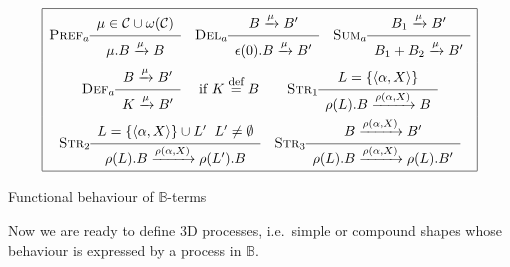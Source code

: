 \documentclass[11pt]{article}
\newcommand{\channels}{{\cal C}}
\newcommand{\bpa}{\mathbb{B}}
\def\sos#1#2{{\def\arraystretch{1.6}\begin{array}{c}#1\\\hline
#2\end{array}}}
\newcommand{\nar}[1]{\xrightarrow{#1}}
\def\name#1{\mbox{\sc #1}}
\newcommand{\equaldef}{\stackrel{\mbox{\footnotesize{def}}}{=}}
\begin{document}
{\small
\begin{table}[t]
\[
\begin{array}{|c|}
\hline
\name{Pref$_{a}$} \sos{\mu \in \channels \cup \omega(\channels)}{\mu.B \nar{\mu} B
} \quad
\name{Del$_a$} \sos{ B \nar{\mu} B'}{\epsilon(0).B \nar{\mu} B'
} \quad
\name{Sum$_a$} \sos{B_1 \nar{\mu} B'}{B_1 + B_2 \nar{\mu} B'}  \\
\name{Def$_a$} \sos{B \nar{\mu} B'} {K \nar{\mu} B'} \quad  \mbox{ if } K \equaldef B\qquad
\name{Str$_{1}$} \sos{L=\{\langle \alpha, X \rangle\}}{\rho(L).B \nar{\rho(\alpha, X)} B
}
\\
\name{Str$_{2}$} \sos{ L = \{\langle \alpha, X \rangle\} \cup L' \;\; L' \neq\emptyset}{\rho(L).B \nar{\rho(\alpha, X)} \rho(L').B
} \quad
\name{Str$_{3}$} \sos{B \nar{\rho(\alpha, X)} B'}{\rho(L).B \nar{\rho(\alpha, X)} \rho(L).B'
}
  \\
\hline
\end{array}\]
\caption{Functional behaviour of $\bpa$-terms}
\label{table:beh-functional}
\end{table}
}

Now we are ready to define 3D processes, i.e.\ simple or compound shapes whose behaviour is expressed by a process in $\bpa$.
\end{document}
